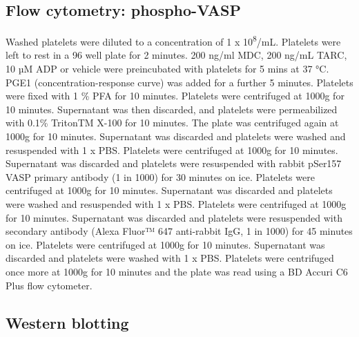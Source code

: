 \documentclass[11pt,twoside]{bristolthesis}
\begin{document}
\hypertarget{flow-cytometry-phospho-vasp}{%
\subsection{Flow cytometry: phospho-VASP}\label{flow-cytometry-phospho-vasp}}

Washed platelets were diluted to a concentration of 1 x 10\textsuperscript{8}/mL. Platelets were left to rest in a 96 well plate for 2 minutes. 200 ng/ml MDC, 200 ng/mL TARC, 10 µM ADP or vehicle were preincubated with platelets for 5 mins at 37 °C. PGE1 (concentration-response curve) was added for a further 5 minutes. Platelets were fixed with 1 \% PFA for 10 minutes. Platelets were centrifuged at 1000g for 10 minutes. Supernatant was then discarded, and platelets were permeabilized with 0.1\% TritonTM X-100 for 10 minutes. The plate was centrifuged again at 1000g for 10 minutes. Supernatant was discarded and platelets were washed and resuspended with 1 x PBS. Platelets were centrifuged at 1000g for 10 minutes. Supernatant was discarded and platelets were resuspended with rabbit pSer157 VASP primary antibody (1 in 1000) for 30 minutes on ice. Platelets were centrifuged at 1000g for 10 minutes. Supernatant was discarded and platelets were washed and resuspended with 1 x PBS. Platelets were centrifuged at 1000g for 10 minutes. Supernatant was discarded and platelets were resuspended with secondary antibody (Alexa Fluor™ 647 anti-rabbit IgG, 1 in 1000) for 45 minutes on ice. Platelets were centrifuged at 1000g for 10 minutes. Supernatant was discarded and platelets were washed with 1 x PBS. Platelets were centrifuged once more at 1000g for 10 minutes and the plate was read using a BD Accuri C6 Plus flow cytometer.

\hypertarget{western-blotting}{%
\subsection{Western blotting}\label{western-blotting}}
\end{document}
